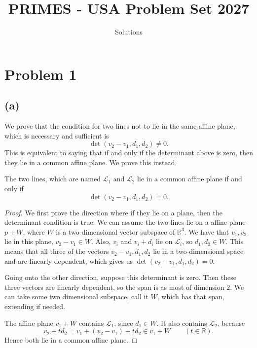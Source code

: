 \documentclass[11pt]{scrartcl}
\title{PRIMES - USA Problem Set 2027}
\subtitle{Solutions}
\begin{document}
	
	\maketitle
	\hrulebar
	
\section{Problem 1}

\subsection{(a)}

\begin{soln}
    We prove that the condition for two lines not to lie in the same affine plane, which
	is necessary and sufficient is
    \[
    \boxed{\det(v_2-v_1,d_1,d_2)\neq0}.
    \]
	This is equivalent to saying that if and only if the determinant above is zero, then they
	lie in a common affine plane. We prove this instead.

 
    \begin{claim*}
        The two lines, which are named $\mathcal L_1$ and $\mathcal L_2$ lie in a common affine
        plane if and only if
        \[
        \det(v_2-v_1,d_1,d_2)=0.
        \]
    \end{claim*}

\begin{proof}
    We first prove the direction where if they lie on a plane, then the 
    determinant condition is true. We can assume the two lines lie on a affine plane
     $p+W$,
    where $W$ is a two-dimensional vector subspace of $\mathbb R^3$.
    We have that  $v_1,v_2$ lie in this plane, $v_2-v_1\in W$.
    Also, $v_i$ and $v_i+d_i$ lie on $\mathcal L_i$, so
    $d_1,d_2\in W$. This means that all three of the vectors
    $v_2-v_1,d_1,d_2$ lie in a two-dimensional space and are
    linearly dependent, which gives us
    $\det(v_2-v_1,d_1,d_2)=0$.

    Going onto the other direction, suppose this determinant is zero. Then these
    three vectors are linearly dependent, so the span
    is as most of dimension $2$. We can take 
    some two dimensional subspace, call it $W$, which has that span, extending if needed.

    The affine plane $v_1+W$ contains $\mathcal L_1$, since
    $d_1\in W$. It also contains $\mathcal L_2$, because
    \[
    v_2+td_2=v_1+(v_2-v_1)+td_2\in v_1+W
    \qquad(t\in\mathbb R).
    \]
Hence both lie in a common affine plane.
\end{proof}


\end{soln}
\end{document}
